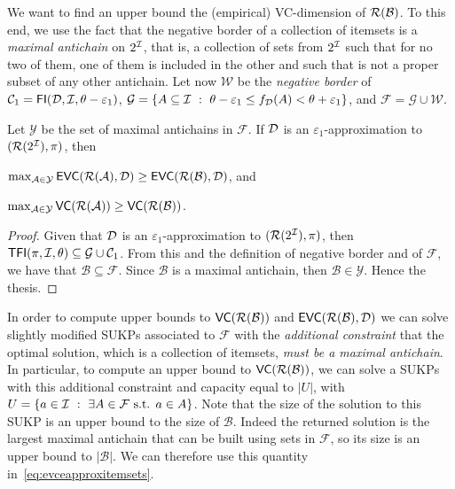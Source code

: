 We want to find an upper bound the (empirical) VC-dimension of
$\mathcal{R}(\mathcal{B})$. To this end, we use the fact that the negative border of
a collection of itemsets is a \emph{maximal antichain} on $2^{\cal I}$, that is, a
collection of sets from $2^{\cal I}$ such that for no two of them, one of them is
included in the other and such that is not a proper subset of any other
antichain. Let now $\mathcal{W}$ be the \emph{negative border} of
$\mathcal{C}_1=\mathsf{FI}({\cal D},{\cal I},\theta-\varepsilon_1)$,
$\mathcal{G}=\{A\subseteq{\cal I} ~:~ \theta-\varepsilon_1\le
f_{\cal D}(A)<\theta+\varepsilon_1\}$, and $\mathcal{F}=\mathcal{G}\cup\mathcal{W}$.

\begin{lemma}\label{lem:antichains}
  Let $\mathcal{Y}$ be the set of maximal antichains in $\mathcal{F}$. If
  ${\cal D}$ is an $\varepsilon_1$-approximation to $(\mathcal{R}(2^{\cal I}),\pi)$, then
  \begin{enumerate*}
    \item
      $\max_{\mathcal{A}\in\mathcal{Y}}\mathsf{EVC}(\mathcal{R}(\mathcal{A}),{\cal D})\ge\mathsf{EVC}(\mathcal{R}(\mathcal{B}),{\cal D})$,
      and
    \item
      $\max_{\mathcal{A}\in\mathcal{Y}}\mathsf{VC}(\mathcal{R}(\mathcal{A}))\ge\mathsf{VC}(\mathcal{R}(\mathcal{B}))$.
  \end{enumerate*}
\end{lemma}

\begin{proof}
  Given that ${\cal D}$ is an $\varepsilon_1$-approximation to
  $(\mathcal{R}(2^{\cal I}),\pi)$, then
  $\mathsf{TFI}(\pi,{\cal I},\theta)\subseteq\mathcal{G}\cup\mathcal{C}_1$. From this and
  the definition of negative border and of $\mathcal{F}$, we have that
  $\mathcal{B}\subseteq\mathcal{F}$. Since $\mathcal{B}$ is a maximal antichain,
  then $\mathcal{B}\in\mathcal{Y}$. Hence the thesis.
\end{proof}

In order to compute upper bounds to $\mathsf{VC}(\mathcal{R}(\mathcal{B}))$ and
$\mathsf{EVC}(\mathcal{R}(\mathcal{B}),{\cal D})$ we can solve slightly modified SUKPs
associated to $\mathcal{F}$ with the \emph{additional constraint} that the
optimal solution, which is a collection of itemsets, \emph{must be a maximal
antichain}. In particular, to compute an upper bound to
$\mathsf{VC}(\mathcal{R}(\mathcal{B}))$, we can solve a SUKPs with this additional constraint
and capacity equal to $|U|$, with $U=\{a\in{\cal I} ~:~ \exists A\in\mathcal{F}
\mbox{ s.t. } a\in A\}$. Note that the size of the solution to this SUKP is an
upper bound to the size of $\mathcal{B}$. Indeed the returned solution is the
largest maximal antichain that can be built using sets in $\mathcal{F}$, so its
size is an upper bound to $|\mathcal{B}|$. We can therefore use this quantity
in~\eqref{eq:evceapproxitemsets}.

